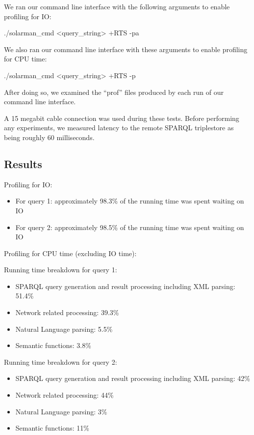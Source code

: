 \documentclass[../main.tex]{subfiles}
\begin{document}
We ran our command line interface with the following arguments to enable profiling for IO:

\begin{code}
	./solarman_cmd <query_string> +RTS -pa
\end{code}

We also ran our command line interface with these arguments to enable profiling for CPU time:

\begin{code}
./solarman_cmd <query_string> +RTS -p
\end{code}

After doing so, we examined the ``prof'' files produced by each run of our command line interface.

A 15 megabit cable connection was used during these tests.  Before performing any experiments,
we measured latency to the remote SPARQL triplestore as being roughly 60 milliseconds.

\subsection{Results}

Profiling for IO:

\begin{itemize}
	\item For query 1: approximately 98.3\% of the running time was spent waiting on IO
	\item For query 2: approximately 98.5\% of the running time was spent waiting on IO
\end{itemize}

\noindent Profiling for CPU time (excluding IO time):

\noindent Running time breakdown for query 1:

\begin{itemize}
	\item SPARQL query generation and result processing including XML parsing: 51.4\%
	\item Network related processing: 39.3\%
	\item Natural Language parsing: 5.5\%
	\item Semantic functions: 3.8\%
\end{itemize}

\noindent Running time breakdown for query 2:

\begin{itemize}
	\item SPARQL query generation and result processing including XML parsing: 42\%
	\item Network related processing: 44\%
	\item Natural Language parsing: 3\%
	\item Semantic functions: 11\%
\end{itemize}
\end{document}
